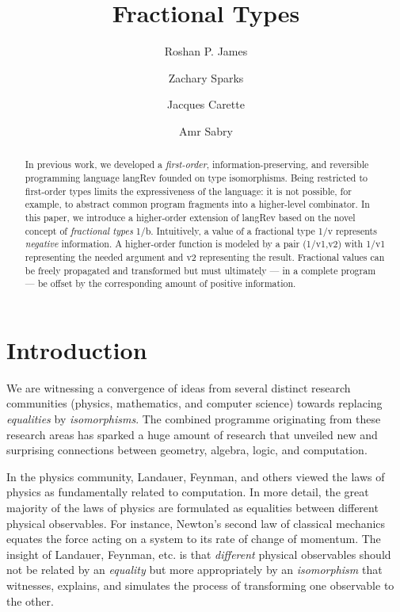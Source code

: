 \documentclass{llncs}
\begin{document}
\title{Fractional Types}
\author{Roshan P. James \and Zachary Sparks \and Jacques Carette \and Amr Sabry}
\institute{}
\maketitle

\begin{abstract}
  In previous work, we developed a \emph{first-order},
  information-preserving, and reversible programming language {{langRev}}
  founded on type isomorphisms. Being restricted to first-order types limits
  the expressiveness of the language: it is not possible, for example, to
  abstract common program fragments into a higher-level combinator. In this
  paper, we introduce a higher-order extension of {{langRev}} based on the
  novel concept of \emph{fractional types} {{1/b}}. Intuitively, a value of a
  fractional type {{1/v}} represents \emph{negative} information. A
  higher-order function is modeled by a pair {{(1/v1,v2)}} with {{1/v1}}
  representing the needed argument and {{v2}} representing the
  result. Fractional values can be freely propagated and transformed but must
  ultimately --- in a complete program --- be offset by the corresponding
  amount of positive information.
\end{abstract}

\section{Introduction} 

We are witnessing a convergence of ideas from several distinct research
communities (physics, mathematics, and computer science) towards replacing
\emph{equalities} by \emph{isomorphisms}. The combined programme originating
from these research areas has sparked a huge amount of research that unveiled
new and surprising connections between geometry, algebra, logic, and
computation.

In the physics community, Landauer, Feynman, and others viewed the laws of
physics as fundamentally related to computation. In more detail, the great
majority of the laws of physics are formulated as equalities between
different physical observables. For instance, Newton's second law of
classical mechanics equates the force acting on a system to its rate of
change of momentum. The insight of Landauer, Feynman, etc. is that
\emph{different} physical observables should not be related by an
\emph{equality} but more appropriately by an \emph{isomorphism} that
witnesses, explains, and simulates the process of transforming one observable
to the other. 
\end{document}

